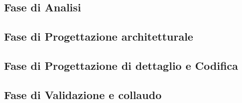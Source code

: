 \documentclass[../piano-di-progetto.tex]{subfiles}
\begin{document}
\subsection{Fase di Analisi}%
\label{sub:fase_analisi}

\subsection{Fase di Progettazione architetturale}%
\label{sub:fase_analisi}

\subsection{Fase di Progettazione di dettaglio e Codifica}%
\label{sub:fase_analisi}

\subsection{Fase di Validazione e collaudo}%
\label{sub:fase_analisi}

\end{document}
